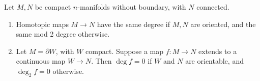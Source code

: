 Let $M, N$ be compact $n$-manifolds without boundary, with $N$ connected.

\begin{enumerate}
\item[(a)] Homotopic maps $M \to N$ have the same degree if $M, N$ are oriented, and the same mod 2 degree otherwise.

\item[(b)] Let $M = \partial W$, with $W$ compact. Suppose a map $f: M \to N$ extends to a continuous map $W \to N$. Then $\deg f = 0$ if $W$ and $N$ are orientable, and $\deg_2 f = 0$ otherwise.
\end{enumerate}
